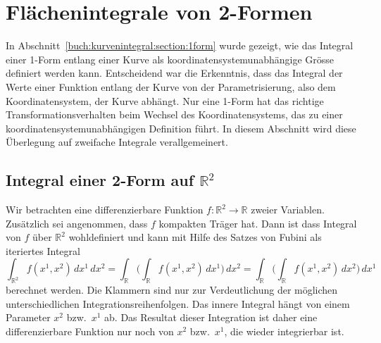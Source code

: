 %
%
\section{Flächenintegrale von 2-Formen
\label{buch:green:section:integral}}
In Abschnitt~\ref{buch:kurvenintegral:section:1form} wurde gezeigt,
wie das Integral einer 1-Form entlang einer Kurve als
koordinatensystemunabhängige Grösse definiert werden kann.
Entscheidend war die Erkenntnis, dass das Integral der Werte einer
Funktion entlang der Kurve von der Parametrisierung, also dem
Koordinatensystem, der Kurve abhängt.
Nur eine 1-Form hat das richtige Transformationsverhalten beim
Wechsel des Koordinatensystems, das zu einer koordinatensystemunabhängigen
Definition führt.
In diesem Abschnitt wird diese Überlegung auf zweifache Integrale
verallgemeinert.

%

%
%
\subsection{Integral einer 2-Form auf $\mathbb{R}^2$}
Wir betrachten eine differenzierbare Funktion
$f\colon \mathbb{R}^2\to\mathbb{R}$ zweier Variablen.
Zusätzlich sei angenommen, dass $f$ kompakten Träger hat. 
Dann ist dass Integral von $f$ über $\mathbb{R}^2$ wohldefiniert
und kann mit Hilfe des Satzes von Fubini als iteriertes Integral
%
\begin{equation}
\int_{\mathbb{R}^2} f(x^1,x^2)\,dx^1\,dx^2
=
\int_{\mathbb{R}} \biggl(\int_{\mathbb{R}} f(x^1,x^2) \,dx^1\biggr) \,dx^2
=
\int_{\mathbb{R}} \biggl(\int_{\mathbb{R}} f(x^1,x^2) \,dx^2\biggr) \,dx^1
\label{buch:green:flaechenintegral:eqn:int2}
\end{equation}
berechnet werden.
Die Klammern sind nur zur Verdeutlichung der möglichen
unterschiedlichen Integrationsreihenfolgen.
Das innere Integral hängt von einem Parameter $x^2$ bzw.~$x^1$ ab.
Das Resultat dieser Integration ist daher eine differenzierbare
Funktion nur noch von $x^2$ bzw.~$x^1$, die wieder integrierbar ist.

